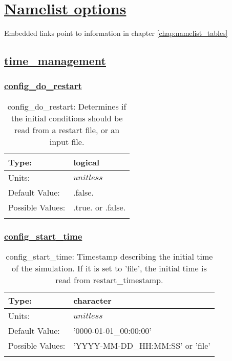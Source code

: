 \chapter[Namelist options]{\hyperref[chap:namelist_tables]{Namelist options}}
\label{chap:namelist_sections}
Embedded links point to information in chapter \ref{chap:namelist_tables}
\section[time\_management]{\hyperref[sec:nm_tab_time_management]{time\_management}}
\label{sec:nm_sec_time_management}
\subsection[config\_do\_restart]{\hyperref[sec:nm_tab_time_management]{config\_do\_restart}}
\label{subsec:nm_sec_config_do_restart}
\begin{center}
\begin{longtable}{| p{2.0in} | p{4.0in} |}
    \hline
    Type: & logical \\
    \hline
    Units: & $unitless$ \\
    \hline
    Default Value: & .false. \\
    \hline
    Possible Values: & .true. or .false. \\
    \hline
    \caption{config\_do\_restart: Determines if the initial conditions should be read from a restart file, or an input file.}
\end{longtable}
\end{center}
\subsection[config\_start\_time]{\hyperref[sec:nm_tab_time_management]{config\_start\_time}}
\label{subsec:nm_sec_config_start_time}
\begin{center}
\begin{longtable}{| p{2.0in} | p{4.0in} |}
    \hline
    Type: & character \\
    \hline
    Units: & $unitless$ \\
    \hline
    Default Value: & '0000-01-01\_00:00:00' \\
    \hline
    Possible Values: & 'YYYY-MM-DD\_HH:MM:SS' or 'file' \\
    \hline
    \caption{config\_start\_time: Timestamp describing the initial time of the simulation. If it is set to 'file', the initial time is read from restart\_timestamp.}
\end{longtable}
\end{center}
